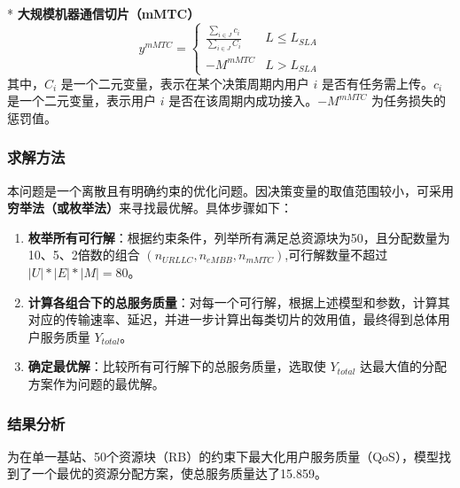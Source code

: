 \documentclass{ctexart}
\begin{document}
* \textbf{大规模机器通信切片（mMTC）}
 $$
 y^{mMTC}=\begin{cases}\frac{\sum_{i\in J}c_{i}}{\sum_{i\in J}C_{i}}&L\le L_{SLA}\\ -M^{mMTC}&L>L_{SLA}\end{cases}
 $$
 其中，$C_i$ 是一个二元变量，表示在某个决策周期内用户 $i$ 是否有任务需上传。$c_i$ 是一个二元变量，表示用户 $i$ 是否在该周期内成功接入。$-M^{mMTC}$ 为任务损失的惩罚值。

\subsubsection{求解方法}
本问题是一个离散且有明确约束的优化问题。因决策变量的取值范围较小，可采用\textbf{穷举法（或枚举法）}来寻找最优解。具体步骤如下：
\begin{enumerate}
 \item \textbf{枚举所有可行解}：根据约束条件，列举所有满足总资源块为50，且分配数量为10、5、2倍数的组合 $(n_{URLLC}, n_{eMBB}, n_{mMTC})$,可行解数量不超过$|U|*|E|*|M|=80$。
 \item \textbf{计算各组合下的总服务质量}：对每一个可行解，根据上述模型和参数，计算其对应的传输速率、延迟，并进一步计算出每类切片的效用值，最终得到总体用户服务质量 $Y_{total}$。
 \item \textbf{确定最优解}：比较所有可行解下的总服务质量，选取使 $Y_{total}$ 达最大值的分配方案作为问题的最优解。
\end{enumerate}

\subsubsection{结果分析}
为在单一基站、50个资源块（RB）的约束下最大化用户服务质量（QoS），模型找到了一个最优的资源分配方案，使总服务质量达了15.859。
\end{document}
